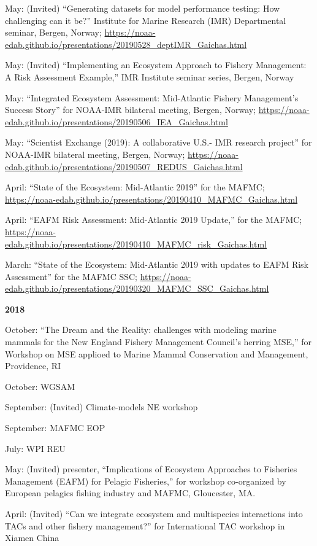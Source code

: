 \documentclass[11pt, a4paper]{awesome-cv}
\begin{document}
May: (Invited) ``Generating datasets for model performance testing: How
challenging can it be?'' Institute for Marine Research (IMR)
Departmental seminar, Bergen, Norway;
\url{https://noaa-edab.github.io/presentations/20190528_deptIMR_Gaichas.html}

May: (Invited) ``Implementing an Ecosystem Approach to Fishery
Management: A Risk Assessment Example,'' IMR Institute seminar series,
Bergen, Norway

May: ``Integrated Ecosystem Assessment: Mid-Atlantic Fishery
Management's Success Story'' for NOAA-IMR bilateral meeting, Bergen,
Norway;
\url{https://noaa-edab.github.io/presentations/20190506_IEA_Gaichas.html}

May: ``Scientist Exchange (2019): A collaborative U.S.- IMR research
project'' for NOAA-IMR bilateral meeting, Bergen, Norway;
\url{https://noaa-edab.github.io/presentations/20190507_REDUS_Gaichas.html}

April: ``State of the Ecosystem: Mid-Atlantic 2019'' for the MAFMC;
\url{https://noaa-edab.github.io/presentations/20190410_MAFMC_Gaichas.html}

April: ``EAFM Risk Assessment: Mid-Atlantic 2019 Update,'' for the
MAFMC;
\url{https://noaa-edab.github.io/presentations/20190410_MAFMC_risk_Gaichas.html}

March: ``State of the Ecosystem: Mid-Atlantic 2019 with updates to EAFM
Risk Assessment'' for the MAFMC SSC;
\url{https://noaa-edab.github.io/presentations/20190320_MAFMC_SSC_Gaichas.html}

\textbf{2018}

October: ``The Dream and the Reality: challenges with modeling marine
mammals for the New England Fishery Management Council's herring MSE,''
for Workshop on MSE applioed to Marine Mammal Conservation and
Management, Providence, RI

October: WGSAM

September: (Invited) Climate-models NE workshop

September: MAFMC EOP

July: WPI REU

May: (Invited) presenter, ``Implications of Ecosystem Approaches to
Fisheries Management (EAFM) for Pelagic Fisheries,'' for workshop
co-organized by European pelagics fishing industry and MAFMC,
Gloucester, MA.

April: (Invited) ``Can we integrate ecosystem and multispecies
interactions into TACs and other fishery management?'' for International
TAC workshop in Xiamen China
\end{document}
